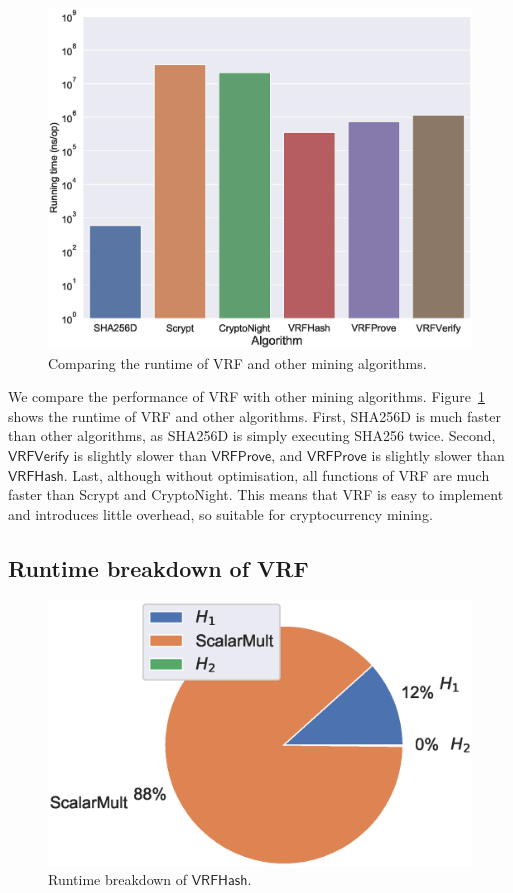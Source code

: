 \begin{figure}[htp]
    \centering
    \includegraphics[width=\linewidth]{figs/runtime-comparison.eps}
    \caption{Comparing the runtime of VRF and other mining algorithms.}
    \label{fig:runtime-comparison}
\end{figure}

We compare the performance of VRF with other mining algorithms.
Figure~\ref{fig:runtime-comparison} shows the runtime of VRF and other algorithms.
First, SHA256D is much faster than other algorithms, as SHA256D is simply executing SHA256 twice.
Second, $\mathsf{VRFVerify}$ is slightly slower than $\mathsf{VRFProve}$, and $\mathsf{VRFProve}$ is slightly slower than $\mathsf{VRFHash}$.
Last, although without optimisation, all functions of VRF are much faster than Scrypt and CryptoNight.
This means that VRF is easy to implement and introduces little overhead, so suitable for cryptocurrency mining.



\subsection{Runtime breakdown of VRF}

\begin{figure}[htp]
    \centering
    \includegraphics[width=\linewidth]{figs/runtime-breakdown.eps}
    \caption{Runtime breakdown of $\mathsf{VRFHash}$.}
    \label{fig:runtime-breakdown}
\end{figure}

